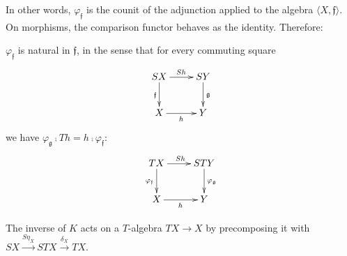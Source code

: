 \documentclass[11pt,a4paper]{article}
\newcommand{\tuple}[1]{\langle #1 \rangle }
\newcommand{\isom}[1]{\varphi_{#1}}
\newcommand{\comparing}{\varphi}
\newcommand{\ti}{T}
\newcommand{\esse}{S}
\newcommand{\f}{\mathfrak{f}}
\newcommand{\g}{\mathfrak{g}}
\begin{document}
In other words, $\isom{\f}$ is the counit of the 
adjunction applied to the algebra $\tuple{X,\f}$.
On morphisms, the comparison functor behaves as the identity.
Therefore:

\begin{remark}
  $\comparing_{\f}$ is natural in $\f$, in the sense
that for every commuting square
$$\xymatrix{
\esse X \ar[d]_{\f} \ar[r]^{\esse h} 
     & \esse Y\ar[d]^{\g}
\\
X \ar[r]_h &  Y
}$$
we have $\isom{\g}\comp Th = h\comp \isom{\f}$:
$$\xymatrix{
\ti X \ar[d]_{\isom{\f}} \ar[r]^{\esse h} 
     & \esse \ti Y\ar[d]^{\isom{\g}}
\\
X \ar[r]_h &  Y
}$$
\close
\end{remark}

The inverse of $K$ acts on a $\ti$-algebra $\ti X \rightarrow X$
by precomposing it with 
$\esse X \stackrel{\esse \eta_X}{\rightarrow}\esse \ti X 
  \stackrel{\delta_X}{\rightarrow} \ti X$.
\end{document}

